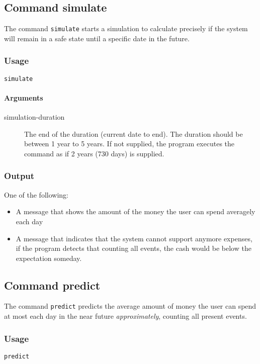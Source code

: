\subsection{Command simulate}
The command \texttt{simulate} starts a simulation to calculate precisely if the system will remain in a safe state until a specific date in the future.
\subsubsection{Usage}
\begin{center}
	\texttt{simulate} 
\end{center}

\paragraph{Arguments}
\begin{description}
	\item[simulation-duration] The end of the duration (current date to end). The duration should be between 1 year to 5 years. If not supplied, the program executes the command as if 2 years (730 days) is supplied.
\end{description}

\subsubsection{Output}
One of the following:
\begin{itemize}
	\item A message that shows the amount of the money the user can spend averagely each day
	\item A message that indicates that the system cannot support anymore expenses, if the program detects that counting all events, the cash would be below the expectation someday.
\end{itemize}

\subsection{Command predict}
The command \texttt{predict} predicts the average amount of money the user can spend at most each day in the near future \emph{approximately}, counting all present events.
\subsubsection{Usage}
\begin{center}
	\texttt{predict} 
\end{center}

